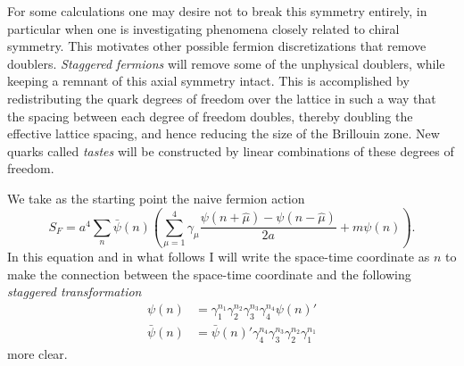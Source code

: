 For some calculations one may desire not to break this symmetry entirely,
in particular when one is investigating phenomena closely related to
chiral symmetry. This motivates other possible fermion discretizations
that remove doublers. {\it Staggered fermions} will remove some of the 
unphysical doublers, while keeping a remnant of this axial symmetry intact. 
This is accomplished by redistributing the quark degrees of freedom over
the lattice in such a way that the spacing between each degree of freedom
doubles, thereby doubling the effective lattice spacing, and hence
reducing the size of the Brillouin zone. New quarks called {\it tastes}
will be constructed by linear combinations of these degrees of freedom.

We take as the starting point the naive fermion action
\begin{equation}
 S_F
     =a^4\sum_n\bar{\psi}(n)\left(\sum_{\mu=1}^4\gamma_\mu
       \frac{\psi(n+\hat{\mu})-\psi(n-\hat{\mu})}{2a}
       +m\psi(n)\right).
\end{equation}
In this equation and in what follows I will write the space-time coordinate
as $n$ to make the connection between the space-time coordinate and the
following {\it staggered transformation}
\begin{equation}\begin{aligned}
\psi(n)&=\gamma_1^{n_1}\gamma_2^{n_2}\gamma_3^{n_3}\gamma_4^{n_4}\psi(n)'\\
\bar{\psi}(n)
   &=\bar{\psi}(n)'\gamma_4^{n_4}\gamma_3^{n_3}\gamma_2^{n_2}\gamma_1^{n_1}
\end{aligned}\end{equation}
more clear. 

